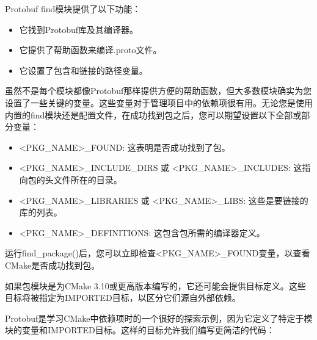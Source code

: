 Protobuf find模块提供了以下功能：

\begin{itemize}
\item
它找到Protobuf库及其编译器。

\item
它提供了帮助函数来编译.proto文件。

\item
它设置了包含和链接的路径变量。
\end{itemize}

虽然不是每个模块都像Protobuf那样提供方便的帮助函数，但大多数模块确实为您设置了一些关键的变量。这些变量对于管理项目中的依赖项很有用。无论您是使用内置的find模块还是配置文件，在成功找到包之后，您可以期望设置以下全部或部分变量：

\begin{itemize}
\item
<PKG\_NAME>\_FOUND: 这表明是否成功找到了包。

\item
<PKG\_NAME>\_INCLUDE\_DIRS 或 <PKG\_NAME>\_INCLUDES: 这指向包的头文件所在的目录。

\item
<PKG\_NAME>\_LIBRARIES 或 <PKG\_NAME>\_LIBS: 这些是要链接的库的列表。

\item
<PKG\_NAME>\_DEFINITIONS: 这包含包所需的编译器定义。
\end{itemize}

运行find\_package()后，您可以立即检查<PKG\_NAME>\_FOUND变量，以查看CMake是否成功找到包。

如果包模块是为CMake 3.10或更高版本编写的，它还可能会提供目标定义。这些目标将被指定为IMPORTED目标，以区分它们源自外部依赖。

Protobuf是学习CMake中依赖项时的一个很好的探索示例，因为它定义了特定于模块的变量和IMPORTED目标。这样的目标允许我们编写更简洁的代码：



